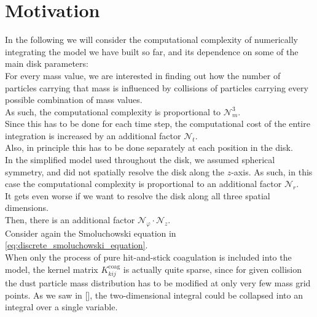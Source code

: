 \section{Motivation}

    In the following we will consider the computational complexity of numerically integrating the 
    model we have built so far, and its dependence on some of the main disk parameters: \\

    For every mass value, we are interested in finding out how the number of particles 
    carrying that mass is influenced by collisions of particles carrying every possible 
    combination of mass values. \\
    As such, the computational complexity is proportional to $\mathcal N_m^3$. \\

    Since this has to be done for each time step, the computational cost of the entire 
    integration is increased by an additional factor $\mathcal N_t$. \\

    Also, in principle this has to be done separately at each position in the disk. \\
    In the simplified model used throughout the disk, we assumed spherical symmetry, and 
    did not spatially resolve the disk along the $z$-axis.
    As such, in this case the computational complexity is proportional to an
    additional factor $\mathcal N_r$. \\

    It gets even worse if we want to resolve the disk along all three spatial dimensions. \\
    Then, there is an additional factor $\mathcal N_\varphi \cdot \mathcal N_z$. \\

    Consider again the Smoluchowski equation in \cref{eq:discrete_smoluchowski_equation}. \\

    When only the process of pure hit-and-stick coagulation is included into the model, the 
    kernel matrix $K_{kij}^\text{coag}$ is actually quite sparse, since for given collision the 
    dust particle mass distribution has to be modified at only very few mass grid points.
    As we saw in [], the two-dimensional integral could be collapsed into an 
    integral over a single variable. \\

